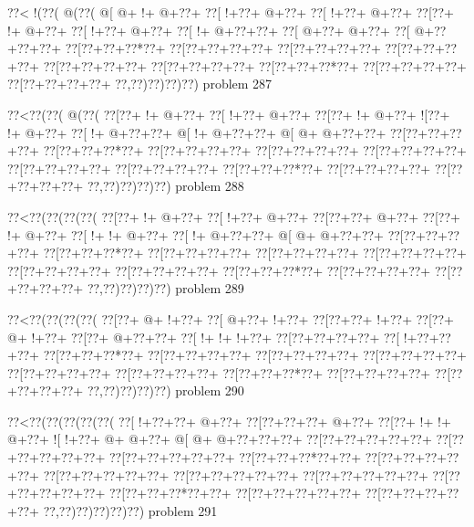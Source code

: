 \vbox{\vbox{\goo
\0??<\- !(\0??(\- @(\0??(
\- @[\- @+\- !+\- @+\0??+
\0??[\- !+\0??+\- @+\0??+
\0??[\- !+\0??+\- @+\0??+
\0??[\0??+\- !+\- @+\0??+
\0??[\- !+\0??+\- @+\0??+
\0??[\- !+\- @+\0??+\0??+
\0??[\- @+\0??+\- @+\0??+
\0??[\- @+\0??+\0??+\0??+
\0??[\0??+\0??+\0??*\0??+
\0??[\0??+\0??+\0??+\0??+
\0??[\0??+\0??+\0??+\0??+
\0??[\0??+\0??+\0??+\0??+
\0??[\0??+\0??+\0??+\0??+
\0??[\0??+\0??+\0??+\0??+
\0??[\0??+\0??+\0??*\0??+
\0??[\0??+\0??+\0??+\0??+
\0??[\0??+\0??+\0??+\0??+
\0??,\0??)\0??)\0??)\0??)
}
\hfil problem 287\hfil\break
}

\vbox{\vbox{\goo
\0??<\0??(\0??(\- @(\0??(
\0??[\0??+\- !+\- @+\0??+
\0??[\- !+\0??+\- @+\0??+
\0??[\0??+\- !+\- @+\0??+
\- ![\0??+\- !+\- @+\0??+
\0??[\- !+\- @+\0??+\0??+
\- @[\- !+\- @+\0??+\0??+
\- @[\- @+\- @+\0??+\0??+
\0??[\0??+\0??+\0??+\0??+
\0??[\0??+\0??+\0??*\0??+
\0??[\0??+\0??+\0??+\0??+
\0??[\0??+\0??+\0??+\0??+
\0??[\0??+\0??+\0??+\0??+
\0??[\0??+\0??+\0??+\0??+
\0??[\0??+\0??+\0??+\0??+
\0??[\0??+\0??+\0??*\0??+
\0??[\0??+\0??+\0??+\0??+
\0??[\0??+\0??+\0??+\0??+
\0??,\0??)\0??)\0??)\0??)
}
\hfil problem 288\hfil\break
}

\vbox{\vbox{\goo
\0??<\0??(\0??(\0??(\0??(
\0??[\0??+\- !+\- @+\0??+
\0??[\- !+\0??+\- @+\0??+
\0??[\0??+\0??+\- @+\0??+
\0??[\0??+\- !+\- @+\0??+
\0??[\- !+\- !+\- @+\0??+
\0??[\- !+\- @+\0??+\0??+
\- @[\- @+\- @+\0??+\0??+
\0??[\0??+\0??+\0??+\0??+
\0??[\0??+\0??+\0??*\0??+
\0??[\0??+\0??+\0??+\0??+
\0??[\0??+\0??+\0??+\0??+
\0??[\0??+\0??+\0??+\0??+
\0??[\0??+\0??+\0??+\0??+
\0??[\0??+\0??+\0??+\0??+
\0??[\0??+\0??+\0??*\0??+
\0??[\0??+\0??+\0??+\0??+
\0??[\0??+\0??+\0??+\0??+
\0??,\0??)\0??)\0??)\0??)
}
\hfil problem 289\hfil\break
}

\vbox{\vbox{\goo
\0??<\0??(\0??(\0??(\0??(
\0??[\0??+\- @+\- !+\0??+
\0??[\- @+\0??+\- !+\0??+
\0??[\0??+\0??+\- !+\0??+
\0??[\0??+\- @+\- !+\0??+
\0??[\0??+\- @+\0??+\0??+
\0??[\- !+\- !+\- !+\0??+
\0??[\0??+\0??+\0??+\0??+
\0??[\- !+\0??+\0??+\0??+
\0??[\0??+\0??+\0??*\0??+
\0??[\0??+\0??+\0??+\0??+
\0??[\0??+\0??+\0??+\0??+
\0??[\0??+\0??+\0??+\0??+
\0??[\0??+\0??+\0??+\0??+
\0??[\0??+\0??+\0??+\0??+
\0??[\0??+\0??+\0??*\0??+
\0??[\0??+\0??+\0??+\0??+
\0??[\0??+\0??+\0??+\0??+
\0??,\0??)\0??)\0??)\0??)
}
\hfil problem 290\hfil\break
}

\vbox{\vbox{\goo
\0??<\0??(\0??(\0??(\0??(\0??(
\0??[\- !+\0??+\0??+\- @+\0??+
\0??[\0??+\0??+\0??+\- @+\0??+
\0??[\0??+\- !+\- !+\- @+\0??+
\- ![\- !+\0??+\- @+\- @+\0??+
\- @[\- @+\- @+\0??+\0??+\0??+
\0??[\0??+\0??+\0??+\0??+\0??+
\0??[\0??+\0??+\0??+\0??+\0??+
\0??[\0??+\0??+\0??+\0??+\0??+
\0??[\0??+\0??+\0??*\0??+\0??+
\0??[\0??+\0??+\0??+\0??+\0??+
\0??[\0??+\0??+\0??+\0??+\0??+
\0??[\0??+\0??+\0??+\0??+\0??+
\0??[\0??+\0??+\0??+\0??+\0??+
\0??[\0??+\0??+\0??+\0??+\0??+
\0??[\0??+\0??+\0??*\0??+\0??+
\0??[\0??+\0??+\0??+\0??+\0??+
\0??[\0??+\0??+\0??+\0??+\0??+
\0??,\0??)\0??)\0??)\0??)\0??)
}
\hfil problem 291\hfil\break
}

